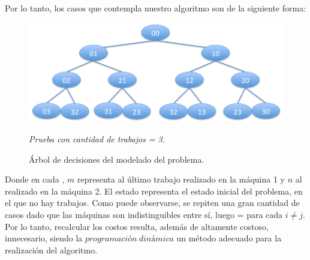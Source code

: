 \newline
Por lo tanto, los casos que contempla nuestro algoritmo son de la siguiente forma:
\begin{figure}[H] %
\begin{center}
\includegraphics[width=400pt]{../imgs/arbol.jpg}
\caption{Árbol de decisiones del modelado del problema.}{\textit{Prueba con cantidad de trabajos = 3.}}
\end{center}
\end{figure}
Donde en cada , $m$ representa al último trabajo realizado en la máquina 1 y $n$ al realizado en la máquina 2. El estado  representa el estado inicial del problema, en el que no hay trabajos. Como puede observarse, se repiten una gran cantidad de casos dado que las máquinas son indistinguibles entre sí, luego = para cada $i \neq j$. Por lo tanto, recalcular los costos resulta, además de altamente costoso, innecesario, siendo la $programación\ dinámica$ un método adecuado para la realización del algoritmo.

